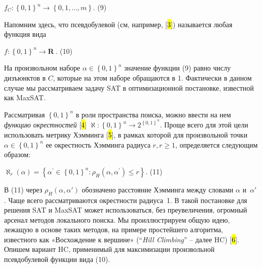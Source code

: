 $f_{C} \colon \left\{ 0,1 \right\}^{n} \to \left\{ 0,1,\ldots,m \right\}$. (9)

Напомним здесь, что псевдобулевой (см, например, {[}\hl{3}{]}) называется любая функция вида

$f \colon \left\{ 0,1 \right\}^{n} \to \mathbf{R}\ .$ (10)

На произвольном наборе $\alpha \in \left\{ 0,1 \right\}^{n}$ значение функции (9) равно числу дизъюнктов в $C$, которые на этом наборе обращаются в 1. Фактически в данном случае мы рассматриваем задачу SAT в оптимизационной постановке, известной как MaxSAT.

Рассматривая $\left\{ 0,1 \right\}^{n}$ в роли пространства поиска, можно ввести на нем \textit{функцию окрестностей} {[}\hl{4}{]} $\aleph:\left\{ 0,1 \right\}^{n} \to 2^{\left\{ 0,1 \right\}^{n}}$. Проще всего для этой цели использовать метрику Хэмминга {[}\hl{5}{]}, в рамках которой для произвольной точки $\alpha \in \left\{ 0,1 \right\}^{n}$ ее окрестность Хэмминга радиуса $r,r \geq 1$, определяется следующим образом:

$\aleph_{r}(\alpha) = \left\{ \alpha^{'} \in \left\{ 0,1 \right\}^{n}:\rho_{H}\left( \alpha,\alpha^{'} \right) \leq r \right\}$. (11)

В (11) через $\rho_{H}(\alpha,\alpha')$ обозначено расстояние Хэмминга между словами $\alpha$ и~$\alpha'$. Чаще всего рассматриваются окрестности радиуса~1. В такой постановке для решения SAT и MaxSAT может использоваться, без преувеличения, огромный арсенал методов локального поиска. Мы проиллюстрируем общую идею, лежащую в основе таких методов, на примере простейшего алгоритма, известного как «Восхождение к вершине» (\enquote{\textit{Hill Climbing}} \--- далее HC) {[}\hl{6}{]}. Опишем вариант HC, применимый для максимизации произвольной псевдобулевой функции вида (10).

